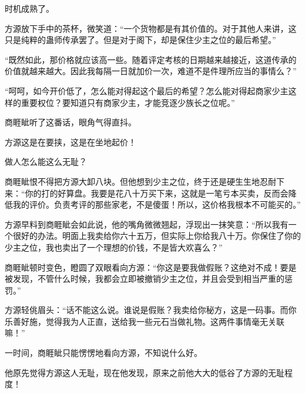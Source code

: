 \begin{this_body}
时机成熟了。

方源放下手中的茶杯，微笑道：“一个货物都是有其价值的。对于其他人来讲，这只是纯粹的蛊师传承罢了。但是对于阁下，却是保住少主之位的最后希望。”

“既然如此，那价格就应该高一些。随着评定考核的日期越来越接近，这道传承的价值就越来越大。因此我每隔一日就加价一次，难道不是件理所应当的事情么？”

“呵呵，如今开价低了，怎么能对得起这个最后的希望？怎么能对得起商家少主这样的重要权位？要知道只有商家少主，才能竞逐少族长之位呢。”

商睚眦听了这番话，眼角气得直抖。

方源这是在要挟，这是在坐地起价！

做人怎么能这么无耻？

商睚眦恨不得把方源大卸八块。但他想到少主之位，终于还是硬生生地忍耐下来：“你的打的好算盘。我要是花八十万买下来，这就是一笔亏本买卖，反而会降低我的评价。负责考评的那些家老，不是傻蛋！所以，这价格我根本不可能买的。”

方源早料到商睚眦会如此说，他的嘴角微微翘起，浮现出一抹笑意：“所以我有一个很好的办法。明面上我卖给你六十五万，但实际上你给我八十万。你保住了你的少主之位，我也卖出了一个理想的价钱，不是皆大欢喜么？”

商睚眦顿时变色，瞪圆了双眼看向方源：“你这是要我做假账？这绝对不成！要是被发现，不管什么时候，我都会立即被撤销少主之位，并且会受到相当严重的惩罚。”

方源轻佻眉头：“话不能这么说。谁说是假账？我卖给你秘方，这是一码事。而你乐善好施，觉得我为人正直，送给我一些元石当做礼物。这两件事情毫无关联嘛！”

一时间，商睚眦只能愣愣地看向方源，不知说什么好。

他原先觉得方源这人无耻，现在他发现，原来之前他大大的低谷了方源的无耻程度！

\end{this_body}


